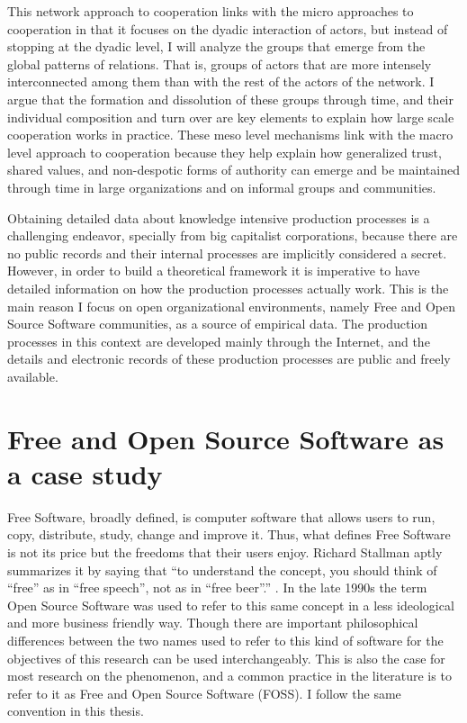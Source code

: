 This network approach to cooperation links with the micro approaches to cooperation in that it focuses on the dyadic interaction of actors, but instead of stopping at the dyadic level, I will analyze the groups that emerge from the global patterns of relations. That is, groups of actors that are more intensely interconnected among them than with the rest of the actors of the network. I argue that the formation and dissolution of these groups through time, and their individual composition and turn over are key elements to explain how large scale cooperation works in practice. These meso level mechanisms link with the macro level approach to cooperation because they help explain how generalized trust, shared values, and non-despotic forms of authority can emerge and be maintained through time in large organizations and on informal groups and communities.

Obtaining detailed data about knowledge intensive production processes is a challenging endeavor, specially from big capitalist corporations, because there are no public records and their internal processes are implicitly considered a secret. However, in order to build a theoretical framework it is imperative to have detailed information on how the production processes actually work. This is the main reason I focus on open organizational environments, namely Free and Open Source Software communities, as a source of empirical data. The production processes in this context are developed mainly through the Internet, and the details and electronic records of these production processes are public and freely available.

\section{Free and Open Source Software as a case study}

Free Software, broadly defined, is computer software that allows users to run, copy, distribute, study, change and improve it. Thus, what defines Free Software is not its price but the freedoms that their users enjoy. Richard Stallman aptly summarizes it by saying that ``to understand the concept, you should think of ``free'' as in ``free speech'', not as in ``free beer''.'' \citep[3]{stallman:2002}. In the late 1990s the term Open Source Software was used to refer to this same concept in a less ideological and more business friendly way. Though there are important philosophical differences between the two names used to refer to this kind of software \citep[75]{stallman:2002b} for the objectives of this research can be used interchangeably. This is also the case for most research on the phenomenon, and a common practice in the literature is to refer to it as Free and Open Source Software (FOSS). I follow the same convention in this thesis.

